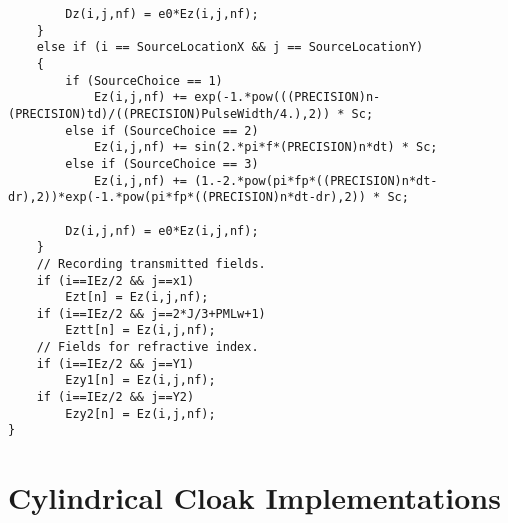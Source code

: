 \begin{lstlisting}
		Dz(i,j,nf) = e0*Ez(i,j,nf);
	}
	else if (i == SourceLocationX && j == SourceLocationY)
	{
		if (SourceChoice == 1)
			Ez(i,j,nf) += exp(-1.*pow(((PRECISION)n-(PRECISION)td)/((PRECISION)PulseWidth/4.),2)) * Sc;
		else if (SourceChoice == 2)
			Ez(i,j,nf) += sin(2.*pi*f*(PRECISION)n*dt) * Sc;
		else if (SourceChoice == 3)
			Ez(i,j,nf) += (1.-2.*pow(pi*fp*((PRECISION)n*dt-dr),2))*exp(-1.*pow(pi*fp*((PRECISION)n*dt-dr),2)) * Sc;

		Dz(i,j,nf) = e0*Ez(i,j,nf);
	}
	// Recording transmitted fields.
	if (i==IEz/2 && j==x1)
		Ezt[n] = Ez(i,j,nf);
	if (i==IEz/2 && j==2*J/3+PMLw+1)
		Eztt[n] = Ez(i,j,nf);
	// Fields for refractive index.
	if (i==IEz/2 && j==Y1)
		Ezy1[n] = Ez(i,j,nf);
	if (i==IEz/2 && j==Y2)
		Ezy2[n] = Ez(i,j,nf);
}
\end{lstlisting}
\chapter{Cylindrical Cloak Implementations}

